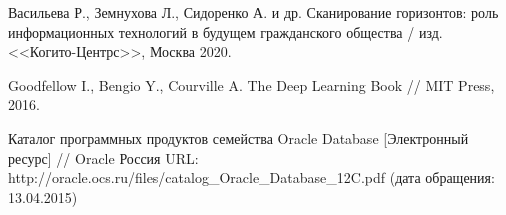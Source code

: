 \begingroup 
\renewcommand{\section}[2]{\anonsection{Библиографический список}}
\begin{thebibliography}{00}

    Васильева Р., Земнухова Л., Сидоренко А. и др.
    Сканирование горизонтов: роль информационных технологий в будущем гражданского общества /
    изд. <<Когито-Центрс>>, Москва 2020.

    Goodfellow I., Bengio Y., Courville A.
    The Deep Learning Book //
    MIT Press, 2016.

    Каталог программных продуктов семейства Oracle Database
    [Электронный ресурс] //
    Oracle Россия
    URL: http://oracle.ocs.ru/files/catalog\_Oracle\_Database\_12C.pdf
    (дата обращения: 13.04.2015)

\end{thebibliography}
\endgroup

\clearpage